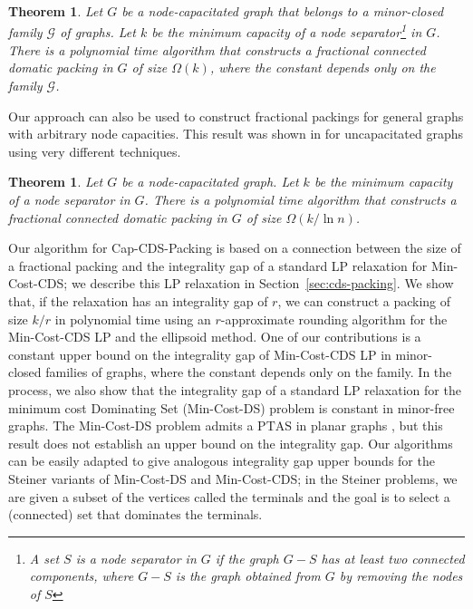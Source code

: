 \documentclass[11pt]{article}
\newtheorem{theorem}[lemma]{Theorem}
\def\script#1{\mathcal{#1}}
\def\sG{\script{G}}
\def\prob#1{\textsf{\textup{#1}}\xspace}
\def\PTAS{\mathrm{PTAS}}
\def\capCDSpack{\prob{Cap-CDS-Packing}}
\def\minCDS{\prob{Min-Cost-CDS}}
\def\minDS{\prob{Min-Cost-DS}}
\begin{document}
\begin{theorem} \label{thm:cds-packing-minor-free}
	Let $G$ be a node-capacitated graph that belongs to a
	minor-closed family $\sG$ of graphs. Let $k$ be the minimum
	capacity of a node separator\footnote{A set $S$ is a node
	separator in $G$ if the graph $G-S$ has at least two connected
	components, where $G-S$ is the graph obtained from $G$ by
	removing the nodes of $S$} in $G$. There is a polynomial time
	algorithm that constructs a fractional connected domatic packing
	in $G$ of size $\Omega(k)$, where the constant depends only on
	the family $\sG$.
\end{theorem}

\noindent
Our approach can also be used to construct fractional packings for
general graphs with arbitrary node capacities. This result was
shown in \cite{CHGK} for uncapacitated graphs using very different
techniques.

\begin{theorem} \label{thm:cds-packing-general}
	Let $G$ be a node-capacitated graph. Let $k$ be the minimum
	capacity of a node separator in $G$. There is a polynomial time
	algorithm that constructs a fractional connected domatic packing
	in $G$ of size $\Omega(k / \ln{n})$.
\end{theorem}

\noindent
Our algorithm for \capCDSpack is based on a connection between the
size of a fractional packing and the integrality gap of a standard LP
relaxation for \minCDS; we describe this LP relaxation in
Section~\ref{sec:cds-packing}. We show that, if the relaxation has an
integrality gap of $r$, we can construct a packing of size $k/r$ in
polynomial time using an $r$-approximate rounding algorithm for the
\minCDS LP and the ellipsoid method. One of our contributions is a
constant upper bound on the integrality gap of \minCDS LP in
minor-closed families of graphs, where the constant depends only on
the family.  In the process, we also show that the integrality gap of
a standard LP relaxation for the minimum cost \prob{Dominating Set}
(\minDS) problem is constant in minor-free graphs. The \minDS problem
admits a $\PTAS$ in planar graphs \cite{Baker94}, but this result
does not establish an upper bound on the integrality gap. Our
algorithms can be easily adapted to give analogous integrality gap
upper bounds for the Steiner variants of \minDS and \minCDS; in the
Steiner problems, we are given a subset of the vertices called the
terminals and the goal is to select a (connected) set that dominates
the terminals.
\end{document}

